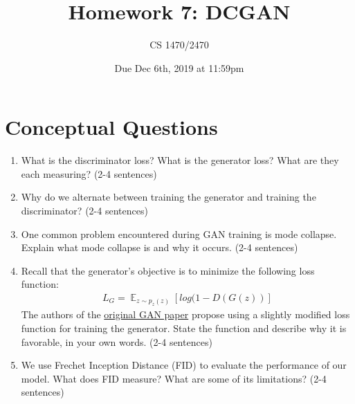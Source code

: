 \documentclass{article}
\title{Homework 7: DCGAN}
\date{Due Dec 6th, 2019 at 11:59pm}
\author{CS 1470/2470}
\begin{document}
\maketitle

\section{Conceptual Questions}
\begin{enumerate}
\item What is the discriminator loss? What is the generator loss? What are they each measuring? (2-4 sentences)

\item Why do we alternate between training the generator and training the discriminator? (2-4 sentences)

\item One common problem encountered during GAN training is mode collapse. Explain what mode collapse is and why it occurs. (2-4 sentences)

\item Recall that the generator's objective is to minimize the following loss function: 
\begin{align*}
    L_G = \mathop{\mathbb{E}}_{z\sim p_z(z)}[log(1 - D(G(z))]
\end{align*}
The authors of the \href{https://arxiv.org/pdf/1406.2661.pdf}{original GAN paper} propose using a slightly modified loss function for training the generator. State the function and describe why it is favorable, in your own words.  (2-4 sentences)

\item We use Frechet Inception Distance (FID) to evaluate the performance of our model. What does FID measure? What are some of its limitations? (2-4 sentences)


\end{enumerate}
\end{document}
